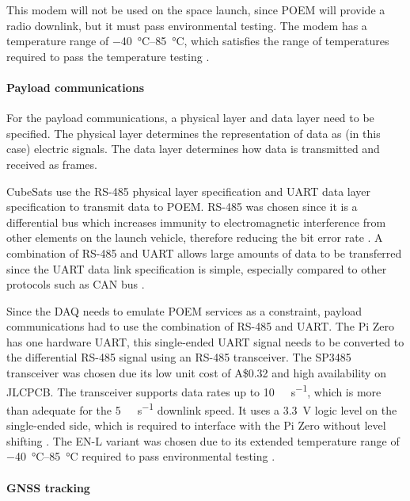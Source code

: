 \documentclass[a4paper,11pt]{article}
\newcommand{\aud}{A\$}
\begin{document}
This modem will not be used on the space launch, since POEM will provide a radio downlink, but it must pass environmental testing. The modem has a temperature range of \SIrange{-40}{85}{\degreeCelsius}, which satisfies the range of temperatures required to pass the temperature testing \cite{rfdesign2020rfd900x}.

\paragraph{Payload communications}
For the payload communications, a physical layer and data layer need to be specified. The physical layer determines the representation of data as (in this case) electric signals. The data layer determines how data is transmitted and received as frames.

CubeSats use the RS-485 physical layer specification and UART data layer specification to transmit data to POEM. RS-485 was chosen since it is a differential bus which increases immunity to electromagnetic interference from other elements on the launch vehicle, therefore reducing the bit error rate \cite{cratere2024board}. A combination of RS-485 and UART allows large amounts of data to be transferred since the UART data link specification is simple, especially compared to other protocols such as CAN bus \cite{cratere2024board}.

Since the DAQ needs to emulate POEM services as a constraint, payload communications had to use the combination of RS-485 and UART. The Pi Zero has one hardware UART, this single-ended UART signal needs to be converted to the differential RS-485 signal using an RS-485 transceiver. The SP3485 transceiver was chosen due its low unit cost of \aud 0.32 and high availability on JLCPCB. The transceiver supports data rates up to \SI{10}{\mega\bit\per\second}, which is more than adequate for the \SI{5}{\kilo\bit\per\second} downlink speed. It uses a \SI{3.3}{\volt} logic level on the single-ended side, which is required to interface with the Pi Zero without level shifting \cite{maxlinear2021sp3485}. The EN-L variant was chosen due to its extended temperature range of \SIrange{-40}{85}{\degreeCelsius} required to pass environmental testing \cite{maxlinear2021sp3485}.

\paragraph{GNSS tracking}
\end{document}
